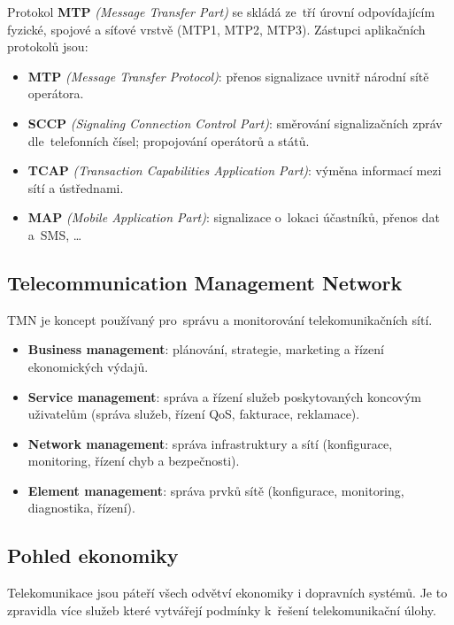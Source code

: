 Protokol \textbf{MTP} \emph{(Message Transfer Part)} se skládá ze~tří úrovní odpovídajícím fyzické, spojové a síťové vrstvě (MTP1, MTP2, MTP3).
Zástupci aplikačních protokolů jsou:

\begin{itemize}
    \item \textbf{MTP} \emph{(Message Transfer Protocol)}: přenos signalizace uvnitř národní sítě operátora.
    \item \textbf{SCCP} \emph{(Signaling Connection Control Part)}: směrování signalizačních zpráv dle~telefonních čísel; propojování operátorů a států.
    \item \textbf{TCAP} \emph{(Transaction Capabilities Application Part)}: výměna informací mezi sítí a ústřednami.
    \item \textbf{MAP} \emph{(Mobile Application Part)}: signalizace o~lokaci účastníků, přenos dat a~SMS, \dots
\end{itemize}


\subsection{Telecommunication Management Network}

TMN je koncept používaný pro~správu a monitorování telekomunikačních sítí.

\begin{itemize}
    \item \textbf{Business management}: plánování, strategie, marketing a řízení ekonomických výdajů.
    \item \textbf{Service management}: správa a řízení služeb poskytovaných koncovým uživatelům (správa služeb, řízení QoS, fakturace, reklamace).
    \item \textbf{Network management}: správa infrastruktury a sítí (konfigurace, monitoring, řízení chyb a bezpečnosti).
    \item \textbf{Element management}: správa prvků sítě (konfigurace, monitoring, diagnostika, řízení).
\end{itemize}


\subsection{Pohled ekonomiky}

Telekomunikace jsou páteří všech odvětví ekonomiky i dopravních systémů.
Je to zpravidla více služeb které vytvářejí podmínky k~řešení telekomunikační úlohy.

